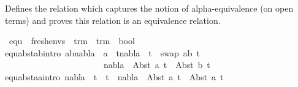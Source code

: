 %
\begin{isabellebody}%
%
%
\isadelimtheory
%
\endisadelimtheory
%
\isatagtheory
%
\endisatagtheory
{\isafoldtheory}%
%
\isadelimtheory
%
\endisadelimtheory
%
\isadelimdocument
%
\endisadelimdocument
%
\isatagdocument
%
\isamarkuptrue%
%
\endisatagdocument
{\isafolddocument}%
%
\isadelimdocument
%
\endisadelimdocument
%
\begin{isamarkuptext}%
Defines the relation which captures the notion of alpha-equivalence (on open terms) 
  and proves this relation is an equivalence relation.%
\end{isamarkuptext}\isamarkuptrue%
\isamarkupfalse%
\ equ\ {\isacharcolon}{\kern0pt}{\isacharcolon}{\kern0pt}\ {\isachardoublequoteopen}fresh{\isacharunderscore}{\kern0pt}envs\ {\isasymRightarrow}\ trm\ {\isasymRightarrow}\ trm\ {\isasymRightarrow}\ bool{\isachardoublequoteclose}\ {\isacharparenleft}{\kern0pt}{\isachardoublequoteopen}\ {\isacharunderscore}{\kern0pt}\ {\isasymturnstile}\ {\isacharunderscore}{\kern0pt}\ {\isasymapprox}\ {\isacharunderscore}{\kern0pt}{\isachardoublequoteclose}\ {\isacharbrackleft}{\kern0pt}{}{}{\isacharcomma}{\kern0pt}{}{}{\isacharcomma}{\kern0pt}{}{}{\isacharbrackright}{\kern0pt}\ {}{}{\isacharparenright}{\kern0pt}\ \isanewline
equ{\isacharunderscore}{\kern0pt}abst{\isacharunderscore}{\kern0pt}ab{\isacharbrackleft}{\kern0pt}intro{\isacharbang}{\kern0pt}{\isacharbrackright}{\kern0pt}{\isacharcolon}{\kern0pt}\ {\isachardoublequoteopen}{\isasymlbrakk}a{\isasymnoteq}b{\isacharsemicolon}{\kern0pt}{\isacharparenleft}{\kern0pt}nabla\ {\isasymturnstile}\ a\ {\isasymsharp}\ t{}{\isacharparenright}{\kern0pt}{\isacharsemicolon}{\kern0pt}{\isacharparenleft}{\kern0pt}nabla\ {\isasymturnstile}\ t{}\ {\isasymapprox}\ {\isacharparenleft}{\kern0pt}swap\ {\isacharbrackleft}{\kern0pt}{\isacharparenleft}{\kern0pt}a{\isacharcomma}{\kern0pt}b{\isacharparenright}{\kern0pt}{\isacharbrackright}{\kern0pt}\ t{}{\isacharparenright}{\kern0pt}{\isacharparenright}{\kern0pt}{\isasymrbrakk}\ \isanewline
\ \ \ \ \ \ \ \ \ \ \ \ \ \ \ \ \ \ \ \ \ \ {\isasymLongrightarrow}\ {\isacharparenleft}{\kern0pt}nabla\ {\isasymturnstile}\ Abst\ a\ t{}\ {\isasymapprox}\ Abst\ b\ t{}{\isacharparenright}{\kern0pt}{\isachardoublequoteclose}\ {\isacharbar}{\kern0pt}\isanewline
equ{\isacharunderscore}{\kern0pt}abst{\isacharunderscore}{\kern0pt}aa{\isacharbrackleft}{\kern0pt}intro{\isacharbang}{\kern0pt}{\isacharbrackright}{\kern0pt}{\isacharcolon}{\kern0pt}\ {\isachardoublequoteopen}{\isacharparenleft}{\kern0pt}nabla\ {\isasymturnstile}\ t{}\ {\isasymapprox}\ t{}{\isacharparenright}{\kern0pt}\ {\isasymLongrightarrow}\ {\isacharparenleft}{\kern0pt}nabla\ {\isasymturnstile}\ Abst\ a\ t{}\ {\isasymapprox}\ Abst\ a\ t{}{\isacharparenright}{\kern0pt}{\isachardoublequoteclose}\ {\isacharbar}{\kern0pt}\isanewline

\end{isabellebody}
